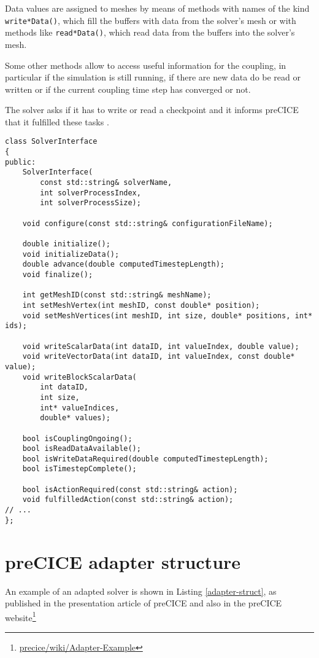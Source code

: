 Data values are assigned to meshes by means of methods with names of the kind \texttt{write*Data()}, which fill the buffers with data from the solver's mesh or
with methods like \texttt{read*Data()}, which read data from the buffers into the solver's mesh.

Some other methods allow to access useful information for the coupling, in particular if the simulation is still running, if there are new data do be read or written or if the current coupling time step has converged or not.

The solver asks if it has to write or read a checkpoint and it informs preCICE that it fulfilled these tasks \cite{uekermann2016partitioned}.

\newpage


\lstset{language=C++}
\begin{lstlisting}[caption=preCICE API methods,label=precice-api-code]
class SolverInterface
{
public:
	SolverInterface(
		const std::string& solverName,
		int solverProcessIndex,
		int solverProcessSize);

	void configure(const std::string& configurationFileName);
	
	double initialize();
	void initializeData();
	double advance(double computedTimestepLength);
	void finalize();
	
	int getMeshID(const std::string& meshName);
	int setMeshVertex(int meshID, const double* position);
	void setMeshVertices(int meshID, int size, double* positions, int* ids);

	void writeScalarData(int dataID, int valueIndex, double value);
	void writeVectorData(int dataID, int valueIndex, const double* value);
	void writeBlockScalarData(
		int dataID,
		int size,
		int* valueIndices,
		double* values);

	bool isCouplingOngoing();
	bool isReadDataAvailable();
	bool isWriteDataRequired(double computedTimestepLength);
	bool isTimestepComplete();

	bool isActionRequired(const std::string& action);
	void fulfilledAction(const std::string& action);
// ...
};
\end{lstlisting}

\newpage

\section{preCICE adapter structure}
\label{sec:adapter-code}

An example of an adapted solver is shown in Listing \ref{adapter-struct}, as published in the presentation article of preCICE \cite{bungartz2016precice} and also in the preCICE website\footnote{\href{https://github.com/precice/precice/wiki/Adapter-Example}{precice/wiki/Adapter-Example}}

